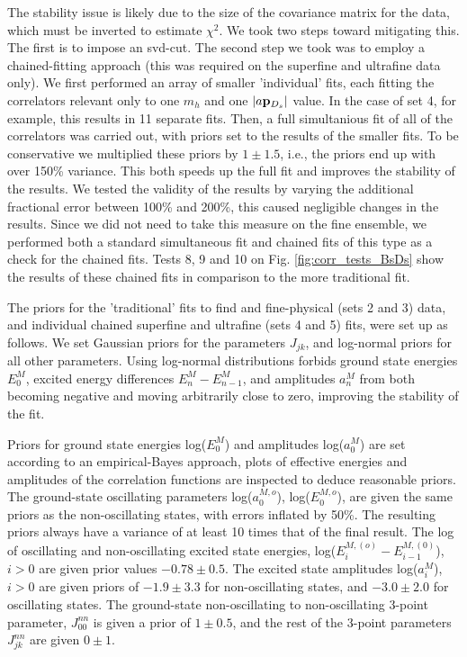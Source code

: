 The stability issue is likely due to the size of the covariance matrix for the data, which must be inverted to estimate $\chi^2$. We took two steps toward mitigating this. The first is to impose an svd-cut. The second step we took was to employ a chained-fitting approach (this was required on the superfine and ultrafine data only). We first performed an array of smaller 'individual' fits, each fitting the correlators relevant only to one $m_h$ and one $|a{\bf{p}}_{D_s}|$ value. In the case of set 4, for example, this results in 11 separate fits. Then, a full simultanious fit of all of the correlators was carried out, with priors set to the results of the smaller fits. To be conservative we multiplied these priors by $1\pm 1.5$, i.e., the priors end up with over 150\% variance. This both speeds up the full fit and improves the stability of the results. We tested the validity of the results by varying the additional fractional error between 100\% and 200\%, this caused negligible changes in the results. Since we did not need to take this measure on the fine ensemble, we performed both a standard simultaneous fit and chained fits of this type as a check for the chained fits. Tests 8, 9 and 10 on Fig. \ref{fig:corr_tests_BsDs} show the results of these chained fits in comparison to the more traditional fit.

The priors for the 'traditional' fits to find and fine-physical (sets 2 and 3) data, and individual chained superfine and ultrafine (sets 4 and 5) fits, were set up as follows. We set Gaussian priors for the parameters $J_{jk}$, and log-normal priors for all other parameters. Using log-normal distributions forbids ground state energies $E_0^M$, excited energy differences $E_n^M-E_{n-1}^M$, and amplitudes $a_n^M$ from both becoming negative and moving arbitrarily close to zero, improving the stability of the fit.

Priors for ground state energies log($E_0^M$) and amplitudes log($a_0^M$) are set according to an empirical-Bayes approach, plots of effective energies and amplitudes of the correlation functions are inspected to deduce reasonable priors. The ground-state oscillating parameters log($a_0^{M,o}$), log($E_0^{M,o}$), are given the same priors as the non-oscillating states, with errors inflated by 50\%. The resulting priors always have a variance of at least 10 times that of the final result. The log of oscillating and non-oscillating excited state energies, log($E_i^{M,(o)}-E_{i-1}^{M,(0)}$), $i>0$ are given prior values $-0.78\pm 0.5$. The excited state amplitudes log($a_i^M$),$i>0$ are given priors of $-1.9\pm 3.3$ for non-oscillating states, and $-3.0\pm 2.0$ for oscillating states. The ground-state non-oscillating to non-oscillating 3-point parameter, $J_{00}^{nn}$ is given a prior of $1\pm 0.5$, and the rest of the 3-point parameters $J_{jk}^{nn}$ are given $0\pm 1$.


